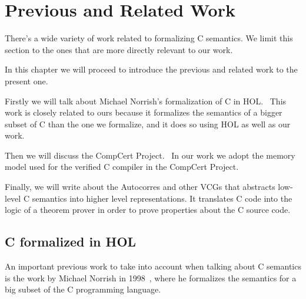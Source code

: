 \chapter{Previous and Related Work}\label{chapter:previous}

There's a wide variety of work related to formalizing C semantics.
We limit this section to the ones that are more directly relevant to our work.

In this chapter we will proceed to introduce the previous and related work to the present one.

Firstly we will talk about Michael Norrish's formalization of C in HOL.~\parencite{norrish}
This work is closely related to ours because it formalizes the semantics of a bigger subset of C than the one we formalize, and it does so using HOL as well as our work.

Then we will discuss the CompCert Project.~\parencite{compcert}
In our work we adopt the memory model used for the verified C compiler in the CompCert Project.

Finally, we will write about the Autocorres and other VCGs that abstracts low-level C semantics into higher level representations.
It translates C code into the logic of a theorem prover in order to prove properties about the C source code.

\section{C formalized in HOL}

An important previous work to take into account when talking about C semantics is the work by Michael Norrish in 1998~\parencite{norrish}, where he formalizes the semantics for a big subset of the C programming language.

